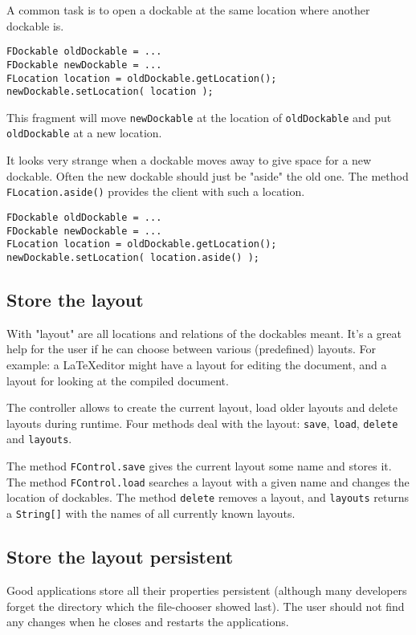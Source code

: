 \documentclass[a4paper,10pt]{article}
\newcommand{\src}[1]{\lstinline[basicstyle=\ttfamily]|#1|}
\begin{document}
A common task is to open a dockable at the same location where another dockable is.
\begin{lstlisting}
FDockable oldDockable = ...
FDockable newDockable = ...
FLocation location = oldDockable.getLocation();
newDockable.setLocation( location );
\end{lstlisting}
This fragment will move \src{newDockable} at the location of \src{oldDockable} and put \src{oldDockable} at a new location.

 It looks very strange when a dockable moves away to give space for a new dockable. Often the new dockable should just be "aside" the old one. The method \src{FLocation.aside()} provides the client with such a location.
\begin{lstlisting}
FDockable oldDockable = ...
FDockable newDockable = ...
FLocation location = oldDockable.getLocation();
newDockable.setLocation( location.aside() );
\end{lstlisting}

\subsection{Store the layout}
With "layout" are all locations and relations of the dockables meant. It's a great help for the user if he can choose between various (predefined) layouts. For example: a \LaTeX editor might have a layout for editing the document, and a layout for looking at the compiled document.

The controller allows to create the current layout, load older layouts and delete layouts during runtime. Four methods deal with the layout: \src{save}, \src{load}, \src{delete} and \src{layouts}.

The method \src{FControl.save} gives the current layout some name and stores it. The method \src{FControl.load} searches a layout with a given name and changes the location of dockables. The method \src{delete} removes a layout, and \src{layouts} returns a \src{String[]} with the names of all currently known layouts.

\subsection{Store the layout persistent}
Good applications store all their properties persistent (although many developers forget the directory which the file-chooser showed last). The user should not find any changes when he closes and restarts the applications.
\end{document}
